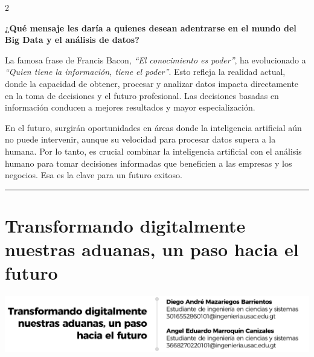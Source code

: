 \documentclass[12pt,spanish,Letterpaper,openany]{book}
\newcommand{\HRule}{\begin{center}\rule{0.5\linewidth}{0.2mm}\end{center}}
\begin{document}
\begin {multicols}{2}
\bigskip
\bigskip
\bigskip

\textbf{¿Qué mensaje les daría a quienes desean adentrarse en el mundo del Big Data y el análisis de datos?}

La famosa frase de Francis Bacon, \emph{``El conocimiento es poder''}, ha evolucionado a \emph{``Quien tiene la información, tiene el poder''}. Esto refleja la realidad actual, donde la capacidad de obtener, procesar y analizar datos impacta directamente en la toma de decisiones y el futuro profesional. Las decisiones basadas en información conducen a mejores resultados y mayor especialización.

En el futuro, surgirán oportunidades en áreas donde la inteligencia artificial aún no puede intervenir, aunque su velocidad para procesar datos supera a la humana. Por lo tanto, es crucial combinar la inteligencia artificial con el análisis humano para tomar decisiones informadas que beneficien a las empresas y los negocios. Esa es la clave para un futuro exitoso.

\end {multicols}

\medskip

\HRule

\medskip

\hypertarget{pareja16}{%
\chapter{Transformando digitalmente nuestras aduanas, un paso hacia el futuro}\label{pareja16}}

\begin{center}\includegraphics[width=1\linewidth]{autores/pareja16_01} \end{center}
\end{document}
